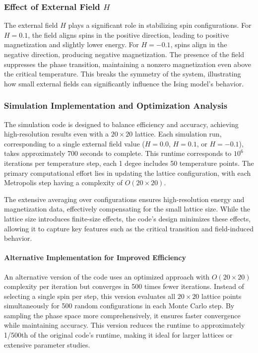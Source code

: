 \documentclass[11pt]{article}
\begin{document}
\subsubsection*{Effect of External Field \(H\)}
The external field \(H\) plays a significant role in stabilizing spin configurations. For \(H = 0.1\), the field aligns spins in the positive direction, leading to positive magnetization and slightly lower energy. For \(H = -0.1\), spins align in the negative direction, producing negative magnetization. The presence of the field suppresses the phase transition, maintaining a nonzero magnetization even above the critical temperature. This breaks the symmetry of the system, illustrating how small external fields can significantly influence the Ising model's behavior.

\subsubsection*{Simulation Implementation and Optimization Analysis}
The simulation code is designed to balance efficiency and accuracy, achieving high-resolution results even with a \(20 \times 20\) lattice. Each simulation run, corresponding to a single external field value (\(H = 0.0\), \(H = 0.1\), or \(H = -0.1\)), takes approximately 700 seconds to complete. This runtime corresponds to \(10^6\) iterations per temperature step, each 1 degee includes 50 temperature points. The primary computational effort lies in updating the lattice configuration, with each Metropolis step having a complexity of \(O(20 \times 20)\).

The extensive averaging over configurations ensures high-resolution energy and magnetization data, effectively compensating for the small lattice size. While the lattice size introduces finite-size effects, the code's design minimizes these effects, allowing it to capture key features such as the critical transition and field-induced behavior.

\paragraph{Alternative Implementation for Improved Efficiency}
An alternative version of the code uses an optimized approach with \(O(20 \times 20)\) complexity per iteration but converges in 500 times fewer iterations. Instead of selecting a single spin per step, this version evaluates all \(20 \times 20\) lattice points simultaneously for 500 random configurations in each Monte Carlo step. By sampling the phase space more comprehensively, it ensures faster convergence while maintaining accuracy. This version reduces the runtime to approximately 1/500th of the original code's runtime, making it ideal for larger lattices or extensive parameter studies.
\end{document}
